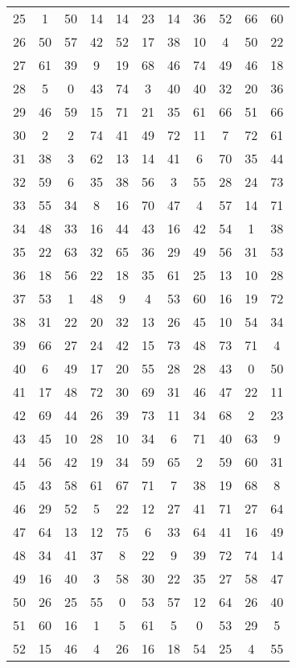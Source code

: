 \begin{table}
\begin{tabular}{c c c c c c c c c c c }
25 & 1 & 50 & 14 & 14 & 23 & 14 & 36 & 52 & 66 & 60 \\
26 & 50 & 57 & 42 & 52 & 17 & 38 & 10 & 4 & 50 & 22 \\
27 & 61 & 39 & 9 & 19 & 68 & 46 & 74 & 49 & 46 & 18 \\
28 & 5 & 0 & 43 & 74 & 3 & 40 & 40 & 32 & 20 & 36 \\
29 & 46 & 59 & 15 & 71 & 21 & 35 & 61 & 66 & 51 & 66 \\
30 & 2 & 2 & 74 & 41 & 49 & 72 & 11 & 7 & 72 & 61 \\
31 & 38 & 3 & 62 & 13 & 14 & 41 & 6 & 70 & 35 & 44 \\
32 & 59 & 6 & 35 & 38 & 56 & 3 & 55 & 28 & 24 & 73 \\
33 & 55 & 34 & 8 & 16 & 70 & 47 & 4 & 57 & 14 & 71 \\
34 & 48 & 33 & 16 & 44 & 43 & 16 & 42 & 54 & 1 & 38 \\
35 & 22 & 63 & 32 & 65 & 36 & 29 & 49 & 56 & 31 & 53 \\
36 & 18 & 56 & 22 & 18 & 35 & 61 & 25 & 13 & 10 & 28 \\
37 & 53 & 1 & 48 & 9 & 4 & 53 & 60 & 16 & 19 & 72 \\
38 & 31 & 22 & 20 & 32 & 13 & 26 & 45 & 10 & 54 & 34 \\
39 & 66 & 27 & 24 & 42 & 15 & 73 & 48 & 73 & 71 & 4 \\
40 & 6 & 49 & 17 & 20 & 55 & 28 & 28 & 43 & 0 & 50 \\
41 & 17 & 48 & 72 & 30 & 69 & 31 & 46 & 47 & 22 & 11 \\
42 & 69 & 44 & 26 & 39 & 73 & 11 & 34 & 68 & 2 & 23 \\
43 & 45 & 10 & 28 & 10 & 34 & 6 & 71 & 40 & 63 & 9 \\
44 & 56 & 42 & 19 & 34 & 59 & 65 & 2 & 59 & 60 & 31 \\
45 & 43 & 58 & 61 & 67 & 71 & 7 & 38 & 19 & 68 & 8 \\
46 & 29 & 52 & 5 & 22 & 12 & 27 & 41 & 71 & 27 & 64 \\
47 & 64 & 13 & 12 & 75 & 6 & 33 & 64 & 41 & 16 & 49 \\
48 & 34 & 41 & 37 & 8 & 22 & 9 & 39 & 72 & 74 & 14 \\
49 & 16 & 40 & 3 & 58 & 30 & 22 & 35 & 27 & 58 & 47 \\
50 & 26 & 25 & 55 & 0 & 53 & 57 & 12 & 64 & 26 & 40 \\
51 & 60 & 16 & 1 & 5 & 61 & 5 & 0 & 53 & 29 & 5 \\
52 & 15 & 46 & 4 & 26 & 16 & 18 & 54 & 25 & 4 & 55 \\

\end{tabular}
\end{table}
